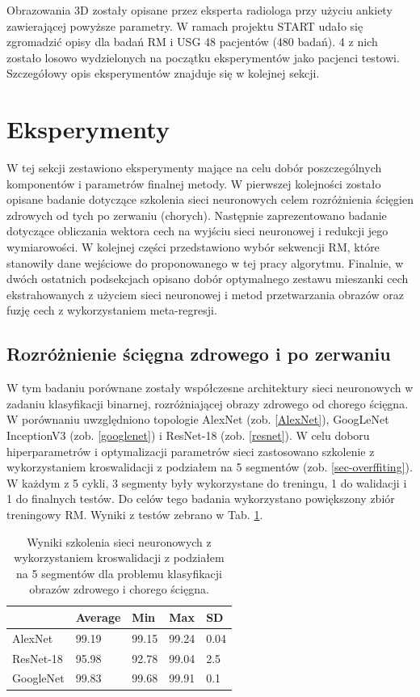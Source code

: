 Obrazowania 3D zostały opisane przez eksperta radiologa przy użyciu ankiety zawierającej powyższe parametry. W ramach projektu START udało się zgromadzić opisy dla badań RM i USG 48 pacjentów (480 badań). 4 z nich zostało losowo wydzielonych na początku eksperymentów jako pacjenci testowi. Szczegółowy opis eksperymentów znajduje się w kolejnej sekcji.

\section{Eksperymenty}

W tej sekcji zestawiono eksperymenty mające na celu dobór poszczególnych komponentów i parametrów finalnej metody. W pierwszej kolejności zostało opisane badanie dotyczące szkolenia sieci neuronowych celem rozróżnienia ścięgien zdrowych od tych po zerwaniu (chorych). Następnie zaprezentowano badanie dotyczące obliczania wektora cech na wyjściu sieci neuronowej i redukcji jego wymiarowości. W kolejnej części przedstawiono wybór sekwencji RM, które stanowiły dane wejściowe do proponowanego w tej pracy algorytmu. Finalnie, w dwóch ostatnich podsekcjach opisano dobór optymalnego zestawu mieszanki cech ekstrahowanych z użyciem sieci neuronowej i metod przetwarzania obrazów oraz fuzję cech z wykorzystaniem meta-regresji.  


\subsection{Rozróżnienie ścięgna zdrowego i po zerwaniu}
\label{binaryMRI}
W tym badaniu porównane zostały współczesne architektury sieci neuronowych w zadaniu klasyfikacji binarnej, rozróżniającej obrazy zdrowego od chorego ścięgna. W porównaniu uwzględniono topologie AlexNet (zob. \ref{AlexNet}), GoogLeNet InceptionV3 (zob. \ref{googlenet}) i ResNet-18 (zob. \ref{resnet}). W celu doboru hiperparametrów i optymalizacji parametrów sieci zastosowano szkolenie z wykorzystaniem kroswalidacji z podziałem na 5 segmentów (zob. \ref{sec-overffiting}). W każdym z 5 cykli, 3 segmenty były wykorzystane do treningu, 1 do walidacji i 1 do finalnych testów. Do celów tego badania wykorzystano powiększony zbiór treningowy RM. Wyniki z testów zebrano w Tab. \ref{cross-validation}.
\begin{table}[h!]
	\setlength{\tabcolsep}{14pt}
	\centering
	\caption{Wyniki szkolenia sieci neuronowych z wykorzystaniem kroswalidacji z podziałem na 5 segmentów dla problemu klasyfikacji obrazów zdrowego i chorego ścięgna.}
	\label{cross-validation}
	\begin{tabular}{l | l | l | l | l }
		 & Average   & Min   & Max   & SD   \\ \hline \hline
		AlexNet   & 99.19 & 99.15 & 99.24 & 0.04 \\ \hline
		ResNet-18 & 95.98 & 92.78 & 99.04 & 2.5  \\ \hline
		GoogleNet & 99.83 & 99.68 & 99.91 & 0.1  \\ %
	\end{tabular}
\end{table}

